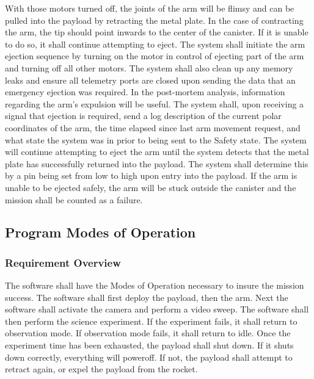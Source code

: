 \documentclass[letterpaper,10pt]{article}
\begin{document}
With those motors turned off, the joints of the arm will be flimsy and can be pulled into the payload by retracting the metal plate.
In the case of contracting the arm, the tip should point inwards to the center of the canister.
If it is unable to do so, it shall continue attempting to eject. 
The system shall initiate the arm ejection sequence by turning on the motor in control of ejecting part of the arm and turning off all
other motors. 
The system shall also clean up any memory leaks and ensure all telemetry ports are closed upon sending the data that an 
emergency ejection was required. In the post-mortem analysis, information regarding the arm's expulsion will be useful. The system
shall, upon receiving a signal that ejection is required, send a log description of the current polar coordinates of the arm, the time 
elapsed since last arm movement request, and what state the system was in prior to being sent to the Safety state. The system will 
continue attempting to eject the arm until the system detects that the metal plate has successfully returned into the payload. 
The system shall determine this by a pin being set from low to high upon entry into the payload. 
If the arm is unable to be ejected safely, the arm will be stuck outside the canister and the mission shall be counted
as a failure.

\subsection{Program Modes of Operation}
\subsubsection{Requirement Overview}
The software shall have the Modes of Operation necessary to insure the mission success.
The software shall first deploy the payload, then the arm. Next the software shall activate the 
camera and perform a video sweep. The software shall then perform the science experiment.
If the experiment fails, it shall return to observation mode.
If observation mode fails, it shall return to idle.
Once the experiment time has been exhausted, the payload shall shut down.
If it shuts down correctly, everything will poweroff. If not, the payload shall attempt to retract 
again, or expel the payload from the rocket.
\end{document}
